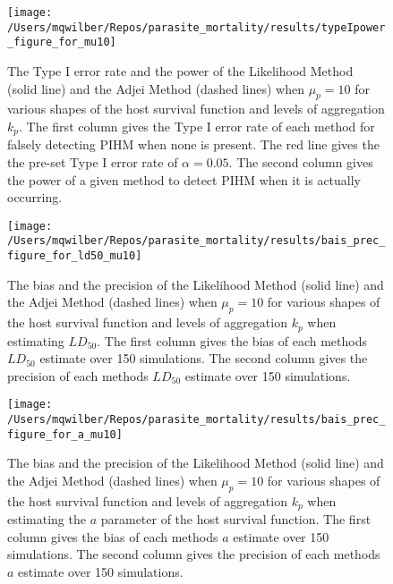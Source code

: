 \documentclass[12pt, a4paper]{article}
\begin{document}
\begin{figure}

    \texttt{[image: /Users/mqwilber/Repos/parasite\_mortality/results/typeIpower\_figure\_for\_mu10]}

    \caption{The Type I error rate and the power of the Likelihood Method (solid line) and the Adjei Method (dashed lines) when $\mu_p = 10$ for various shapes of the host survival function and levels of aggregation $k_p$.  The first column gives the Type I error rate of each method for falsely detecting PIHM when none is present.  The red line gives the the pre-set Type I error rate of $\alpha = 0.05$.  The second column gives the power of a given method to detect PIHM when it is actually occurring. }
    \label{fig:typeI10}

\end{figure}


\begin{figure}

    \texttt{[image: /Users/mqwilber/Repos/parasite\_mortality/results/bais\_prec\_figure\_for\_ld50\_mu10]}

    \caption{The bias and the precision of the Likelihood Method (solid line) and the Adjei Method (dashed lines) when $\mu_p = 10$ for various shapes of the host survival function and levels of aggregation $k_p$ when estimating $LD_{50}$.  The first column gives the bias of each methods $LD_{50}$ estimate over 150 simulations. The second column gives the precision of each methods $LD_{50}$ estimate over 150 simulations.}

    \label{fig:biasld50}

\end{figure}

\begin{figure}

    \texttt{[image: /Users/mqwilber/Repos/parasite\_mortality/results/bais\_prec\_figure\_for\_a\_mu10]}

    \caption{The bias and the precision of the Likelihood Method (solid line) and the Adjei Method (dashed lines) when $\mu_p = 10$ for various shapes of the host survival function and levels of aggregation $k_p$ when estimating the $a$ parameter of the host survival function.  The first column gives the bias of each methods $a$ estimate over 150 simulations. The second column gives the precision of each methods $a$ estimate over 150 simulations.}

    \label{fig:biasa}

\end{figure}
\end{document}
